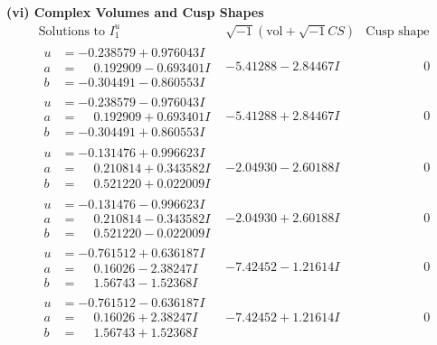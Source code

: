 \documentclass[1p]{elsarticle_modified}
\theoremstyle{definition}
\newcommand{\I}{\sqrt{-1}}
\begin{document}
\newpage\flushleft \textbf{(vi) Complex Volumes and Cusp Shapes}
$$\begin{array}{c|c|c}  
\text{Solutions to }I^u_{1}& \I (\text{vol} + \sqrt{-1}CS) & \text{Cusp shape}\\
 \hline 
\begin{aligned}
u &= -0.238579 + 0.976043 I \\
a &= \phantom{-}0.192909 - 0.693401 I \\
b &= -0.304491 - 0.860553 I\end{aligned}
 & -5.41288 - 2.84467 I & \phantom{-0.000000 } 0 \\ \hline\begin{aligned}
u &= -0.238579 - 0.976043 I \\
a &= \phantom{-}0.192909 + 0.693401 I \\
b &= -0.304491 + 0.860553 I\end{aligned}
 & -5.41288 + 2.84467 I & \phantom{-0.000000 } 0 \\ \hline\begin{aligned}
u &= -0.131476 + 0.996623 I \\
a &= \phantom{-}0.210814 + 0.343582 I \\
b &= \phantom{-}0.521220 + 0.022009 I\end{aligned}
 & -2.04930 - 2.60188 I & \phantom{-0.000000 } 0 \\ \hline\begin{aligned}
u &= -0.131476 - 0.996623 I \\
a &= \phantom{-}0.210814 - 0.343582 I \\
b &= \phantom{-}0.521220 - 0.022009 I\end{aligned}
 & -2.04930 + 2.60188 I & \phantom{-0.000000 } 0 \\ \hline\begin{aligned}
u &= -0.761512 + 0.636187 I \\
a &= \phantom{-}0.16026 - 2.38247 I \\
b &= \phantom{-}1.56743 - 1.52368 I\end{aligned}
 & -7.42452 - 1.21614 I & \phantom{-0.000000 } 0 \\ \hline\begin{aligned}
u &= -0.761512 - 0.636187 I \\
a &= \phantom{-}0.16026 + 2.38247 I \\
b &= \phantom{-}1.56743 + 1.52368 I\end{aligned}
 & -7.42452 + 1.21614 I & \phantom{-0.000000 } 0 \\ \hline\begin{aligned}

\end{aligned}
\end{array}$$
\end{document}
